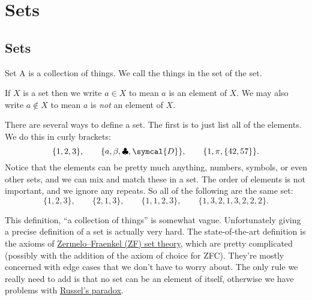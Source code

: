 \documentclass[fleqn]{LectureClass/LectureClass}
\begin{document}
    \chapter{Sets}
    \section{Sets}
    \begin{dfn}{Set}{}
        A  is a collection of things.
        We call the things in the set  of the set.
    \end{dfn}
    
    \begin{ntn}{}{}
        If \(X\) is a set then we write \(a \in X\) to mean \(a\) is an element of \(X\).
        We may also write \(a \notin X\) to mean \(a\) is \emph{not} an element of \(X\).
    \end{ntn}
    
    There are several ways to define a set.
    The first is to just list all of the elements.
    We do this in curly brackets:
    \begin{equation}
        \{1, 2, 3\}, \qquad \{a, \beta, \clubsuit, \symcal{D}\}, \qquad \{1, \pi, \{42, 57\}\}.
    \end{equation}
    Notice that the elements can be pretty much anything, numbers, symbols, or even other sets, and we can mix and match these in a set.
    The order of elements is not important, and we ignore any repeats.
    So all of the following are the same set:
    \begin{equation}
        \{1, 2, 3\}, \qquad \{2, 1, 3\}, \qquad \{1, 1, 2, 3\}, \qquad \{1, 3, 2, 1, 3, 2, 2, 2\}.
    \end{equation}
    
    \begin{remark}{}{}
        This definition, \enquote{a collection of things} is somewhat vague.
        Unfortunately giving a precise definition of a set is actually very hard.
        The state-of-the-art definition is the axioms of \href{https://en.wikipedia.org/wiki/Zermelo%E2%80%93Fraenkel_set_theory}{Zermelo--Fraenkel (ZF) set theory}, which are pretty complicated (possibly with the addition of the axiom of choice for ZFC).
        They're mostly concerned with edge cases that we don't have to worry about.
        The only rule we really need to add is that no set can be an element of itself, otherwise we have problems with \href{https://en.wikipedia.org/wiki/Russell%27s_paradox}{Russel's paradox}.
    \end{remark}
    
\end{document}
